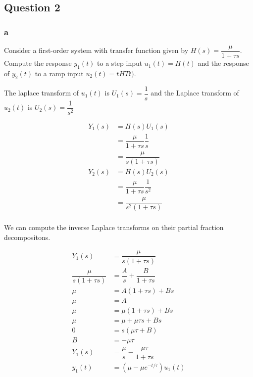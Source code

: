 \documentclass[11pt]{article}
\begin{document}
\subsection{Question 2}

\subsubsection{a}

Consider a first-order system with transfer function given by $H(s) = \dfrac{\mu}{1 + \tau s}$. Compute the response $y_1(t)$ to a step input $u_1(t) = H(t)$ and the response of $y_2(t)$ to a ramp input $u_2(t) = tHTt)$.

The laplace transform of $u_1(t)$ is $U_1(s) = \dfrac{1}{s}$ and the Laplace transform of $u_2(t)$ is $U_2(s) = \dfrac{1}{s^2}$

\begin{align*}
    Y_1(s) &= H(s) U_1(s) \\
     &= \dfrac{\mu}{1 + \tau s} \dfrac{1}{s} \\
     &= \dfrac{\mu}{s(1 + \tau s)} \\
    Y_2(s) &= H(s) U_2(s) \\
    &= \dfrac{\mu}{1 +\tau s} \dfrac{1}{s^2} \\
    &= \dfrac{\mu}{s^2(1 + \tau s)} \\
\end{align*}

We can compute the inverse Laplace transforms on their partial fraction decompositons.

\begin{align*}
    Y_1(s) &= \dfrac{\mu}{s(1 + \tau s)} \\
    \dfrac{\mu}{s(1 + \tau s)} &= \dfrac{A}{s} + \dfrac{B}{1 + \tau s} \\
    \mu &= A(1 + \tau s) + Bs \\
    \mu &= A \tag{s = 0} \\ 
    \mu &= \mu (1 + \tau s) + Bs \\
    \mu &= \mu + \mu \tau s + Bs \\
    0 &= s (\mu \tau + B) \tag{$s \neq 0$} \\
    B &= -\mu \tau \\
    Y_1(s) &= \dfrac{\mu}{s} - \dfrac{\mu \tau}{1 + \tau s} \\
    y_1(t) &= (\mu - \mu e^{-t / \tau}) u_1(t) \\
\end{align*}
\end{document}
